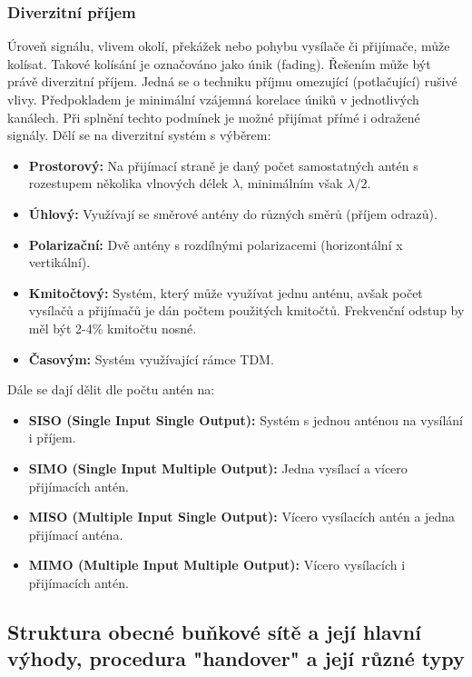		\subsubsection{Diverzitní příjem}
			Úroveň signálu, vlivem okolí, překážek nebo pohybu vysílače či přijímače, může kolísat. Takové kolísání je označováno jako únik (fading). Řešením může být právě diverzitní příjem. Jedná se o techniku příjmu omezující (potlačující) rušivé vlivy. Předpokladem je minimální vzájemná korelace úniků v jednotlivých kanálech. Při splnění techto podmínek je možné přijímat přímé i odražené signály. Dělí se na diverzitní systém s výběrem:
			\begin{itemize}
				\item \textbf{Prostorový:} Na přijímací straně je daný počet samostatných antén s rozestupem několika vlnových délek $\lambda$, minimálním však $\lambda/2$.
				\item \textbf{Úhlový:} Využívají se směrové antény do různých směrů (příjem odrazů).
				\item \textbf{Polarizační:} Dvě antény s rozdílnými polarizacemi (horizontální x vertikální).
				\item \textbf{Kmitočtový:} Systém, který může využívat jednu anténu, avšak počet vysílačů a přijímačů je dán počtem použitých kmitočtů. Frekvenční odstup by měl být 2-4\% kmitočtu nosné.
				\item \textbf{Časovým:} Systém využívající rámce TDM.
			\end{itemize}
			Dále se dají dělit dle počtu antén na:
			\begin{itemize}
				\item \textbf{SISO (Single Input Single Output):} Systém s jednou anténou na vysílání i příjem.
				\item \textbf{SIMO (Single Input Multiple Output):} Jedna vysílací a vícero přijímacích antén.
				\item \textbf{MISO (Multiple Input Single Output):} Vícero vysílacích antén a jedna přijímací anténa.
				\item \textbf{MIMO (Multiple Input Multiple Output):} Vícero vysílacích i přijímacích antén.
			\end{itemize}
	\subsection{Struktura obecné buňkové sítě a její hlavní výhody, procedura "handover" a její různé typy}
